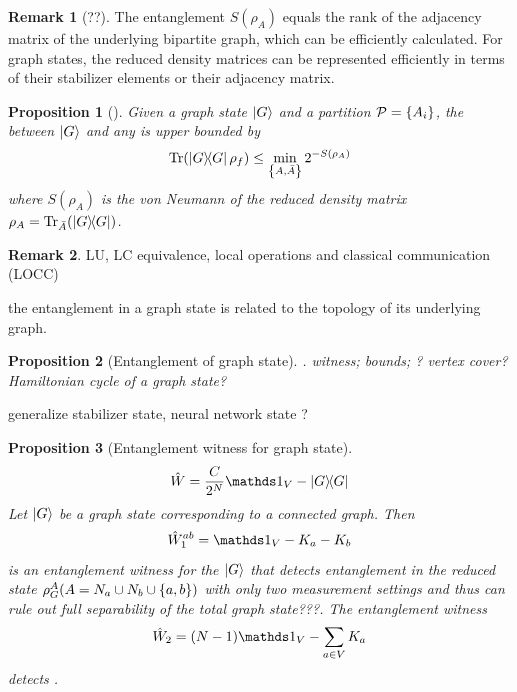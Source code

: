 \documentclass[
10pt,
aps,
pra,
linenumbers,
floatfix,
]{revtex4-2}
\theoremstyle{plain}
\newtheorem{proposition}{Proposition}
\theoremstyle{definition}
\newtheorem{remark}{Remark}
\newcommand{\ew}{\hat{W}}
\newcommand{\dm}{\rho}
\begin{document}
\begin{remark}[??]
	The entanglement  $S( \dm_A )$ equals the rank of the adjacency matrix of the underlying bipartite graph, which can be efficiently calculated.
	For graph states, the reduced density matrices can be represented efficiently in terms of their stabilizer elements or their adjacency matrix.
\end{remark}
\begin{proposition}[\cite{zhouDetectingMultipartiteEntanglement2019}]
	Given a graph state $\ket{G}$ and a partition $\mathcal{P}=\qty{A_i}$, the  between $\ket{G}$ and any  is upper bounded by
	\begin{equation}
		\Tr(\op{G} \dm_f) \le \min_{\qty{A,\bar{A}}} 2^{-S(\dm_A)}
	\end{equation}
	where $S(\dm_A)$ is the von Neumann  of the reduced density matrix $\dm_A=\Tr_{\bar{A}}(\op{G})$.
\end{proposition}
\begin{remark}
	LU, LC equivalence, local operations and classical communication (LOCC)
\end{remark}
the entanglement in a graph state is related to the topology of its underlying graph.
\begin{proposition}[Entanglement of graph state]
	\cite{heinEntanglementGraphStates2006}.
	witness; bounds; ? vertex cover?
	Hamiltonian cycle of a graph state? 
\end{proposition}
generalize \cite{zhangEfficientEntanglementGeneration2021}
stabilizer state, neural network state \cite{gaoEfficientRepresentationQuantum2017}?
\begin{proposition}[Entanglement witness for graph state]
	\begin{equation}
		\ew = \frac{C}{2^N} \identity_V - \op{G}
	\end{equation}
	Let $\ket{G}$ be a graph state corresponding to a connected graph. Then
	\begin{equation}
		\ew_1^{ab} = \identity_V - K_a - K_b
	\end{equation}
	is an entanglement witness for the $\ket{G}$ that detects entanglement in the reduced state $\dm_G^A (A=N_a\cup N_b \cup \qty{a,b})$ with only two measurement settings and thus can rule out full separability of the total graph state???. 
	The entanglement witness 
	\begin{equation}
		\ew_2 = (N-1)\identity_V - \sum_{a\in V} K_a
	\end{equation}
	detects . 
\end{proposition}
\end{document}
